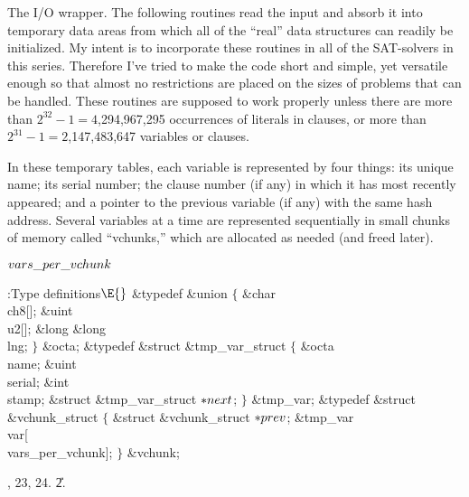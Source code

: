 The I/O wrapper. The following routines read the input and
absorb it into
temporary data areas from which all of the ``real'' data structures
can readily be initialized. My intent is to incorporate these routines in all
of the SAT-solvers in this series. Therefore I've tried to make the code
short and simple, yet versatile enough so that almost no restrictions are
placed on the sizes of problems that can be handled. These routines are
supposed to work properly unless there are more than
$2^{32}-1=4$,294,967,295 occurrences of literals in clauses,
or more than $2^{31}-1=2$,147,483,647 variables or clauses.

In these temporary tables, each variable is represented by four things:
its unique name; its serial number; the clause number (if any) in which it has
most recently appeared; and a pointer to the previous variable (if any)
with the same hash address. Several variables at a time
are represented sequentially in small chunks of memory called ``vchunks,''
which are allocated as needed (and freed later).

\Y\B\4\D$\\{vars\_per\_vchunk}$ \5
\par
\Y\B\4:Type definitions\X${}\E{}$\6
\&{typedef} \&{union} ${}\{{}$\1\6
\&{char} \\{ch8}[];\6
\&{uint} \\{u2}[];\6
\&{long} \&{long} \\{lng};\2\6
${}\}{}$ \&{octa};\6
\&{typedef} \&{struct} \&{tmp\_var\_struct} ${}\{{}$\1\6
\&{octa} \\{name};\6
\&{uint} \\{serial};\6
\&{int} \\{stamp};\6
\&{struct} \&{tmp\_var\_struct} ${}{*}\\{next}{}$;\2%
\6
${}\}{}$ \&{tmp\_var};\7
\&{typedef} \&{struct} \&{vchunk\_struct} ${}\{{}$\1\6
\&{struct} \&{vchunk\_struct} ${}{*}\\{prev}{}$;\6
\&{tmp\_var} \\{var}[\\{vars\_per\_vchunk}];\2\6
${}\}{}$ \&{vchunk};\par
{}, 23, 24.
\U2.\fi

